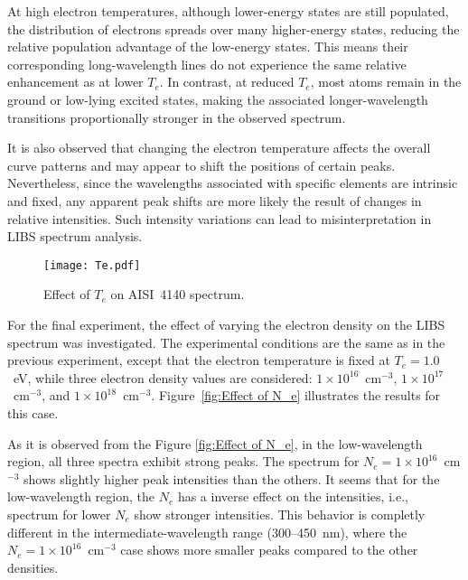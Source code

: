 \documentclass[12pt,a4paper]{article}
\begin{document}
	At high electron temperatures, although lower-energy states are still populated, the distribution of electrons spreads over many higher-energy states, reducing the relative population advantage of the low-energy states. This means their corresponding long-wavelength lines do not experience the same relative enhancement as at lower $T_e$. In contrast, at reduced $T_e$, most atoms remain in the ground or low-lying excited states, making the associated longer-wavelength transitions proportionally stronger in the observed spectrum.  
	
	It is also observed that changing the electron temperature affects the overall curve patterns and may appear to shift the positions of certain peaks. Nevertheless, since the wavelengths associated with specific elements are intrinsic and fixed, any apparent peak shifts are more likely the result of changes in relative intensities. Such intensity variations can lead to misinterpretation in LIBS spectrum analysis.
	
		
		
	\begin{figure}[h!]
		\centering
		\texttt{[image: Te.pdf]}
		\caption{Effect of $T_e$ on AISI~4140 spectrum.}
		\label{fig:Effect of T_e}
	\end{figure}
	
	For the final experiment, the effect of varying the electron density on the LIBS spectrum was investigated. The experimental conditions are the same as in the previous experiment, except that the electron temperature is fixed at $T_e = 1.0$~eV, while three electron density values are considered: $1\times10^{16}$~cm$^{-3}$, $1\times10^{17}$~cm$^{-3}$, and $1\times10^{18}$~cm$^{-3}$. Figure~\ref{fig:Effect of N_e} illustrates the results for this case.
	
	 As it is observed from the Figure \ref{fig:Effect of N_e}, in the low-wavelength region, all three spectra exhibit strong peaks. The spectrum for $N_e = 1\times 10^{16}$~cm$^{-3}$ shows slightly higher peak intensities than the others. It seems that for the low-wavelength region, the $N_e$ has a inverse effect on the intensities, i.e., spectrum for lower $N_e$ show stronger intensities. This behavior is completly different in the intermediate-wavelength range (300--450~nm), where the $N_e = 1\times 10^{16}$~cm$^{-3}$ case shows more  smaller peaks compared to the other densities.
	 
	 
	 
	
		
\end{document}

